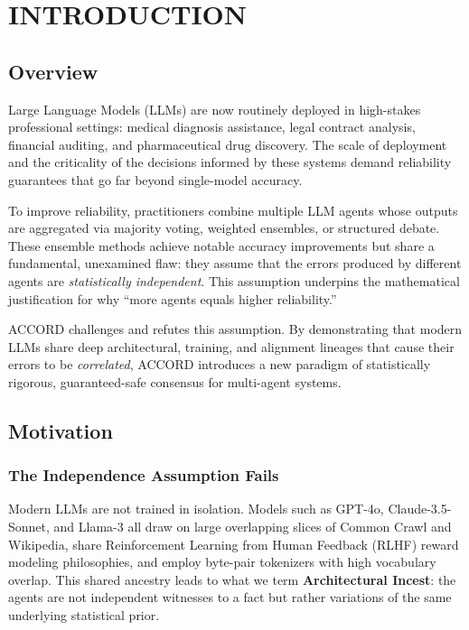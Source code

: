 \documentclass[12pt,a4paper]{report}
\begin{document}
\chapter{INTRODUCTION}

\section{Overview}

Large Language Models (LLMs) are now routinely deployed in high-stakes professional settings: medical diagnosis assistance, legal contract analysis, financial auditing, and pharmaceutical drug discovery. The scale of deployment and the criticality of the decisions informed by these systems demand reliability guarantees that go far beyond single-model accuracy.

To improve reliability, practitioners combine multiple LLM agents whose outputs are aggregated via majority voting, weighted ensembles, or structured debate. These ensemble methods achieve notable accuracy improvements but share a fundamental, unexamined flaw: they assume that the errors produced by different agents are \emph{statistically independent}. This assumption underpins the mathematical justification for why ``more agents equals higher reliability.''

ACCORD challenges and refutes this assumption. By demonstrating that modern LLMs share deep architectural, training, and alignment lineages that cause their errors to be \emph{correlated}, ACCORD introduces a new paradigm of statistically rigorous, guaranteed-safe consensus for multi-agent systems.

\section{Motivation}

\subsection{The Independence Assumption Fails}
Modern LLMs are not trained in isolation. Models such as GPT-4o, Claude-3.5-Sonnet, and Llama-3 all draw on large overlapping slices of Common Crawl and Wikipedia, share Reinforcement Learning from Human Feedback (RLHF) reward modeling philosophies, and employ byte-pair tokenizers with high vocabulary overlap. This shared ancestry leads to what we term \textbf{Architectural Incest}: the agents are not independent witnesses to a fact but rather variations of the same underlying statistical prior.
\end{document}
